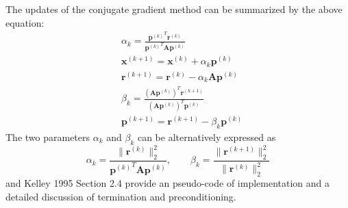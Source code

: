 \documentclass{article}
\begin{document}
The updates of the conjugate gradient method can be summarized by the above equation:
\begin{align*}
    & \alpha_k = 
    \frac{\left.\mathbf{p}^{(k)}\right.^T \mathbf{r}^{(k)}}
    {\left.\mathbf{p}^{(k)}\right.^T \mathbf{A} \mathbf{p}^{(k)}} \\
    & \mathbf{x}^{(k+1)} = \mathbf{x}^{(k)} + \alpha_k \mathbf{p}^{(k)} \\
    & \mathbf{r}^{(k+1)} = \mathbf{r}^{(k)} - \alpha_k \mathbf{A}\mathbf{p}^{(k)} \\
    & \beta_k = \frac{\left(\mathbf{A} \mathbf{p}^{(k)} \right)^T \mathbf{r}^{(k+1)}}{\left(\mathbf{A} \mathbf{p}^{(k)} \right)^T \mathbf{p}^{(k)}} \\
    & \mathbf{p}^{(k+1)} = \mathbf{r}^{(k+1)} - \beta_k \mathbf{p}^{(k)}
\end{align*}
The two parameters $\alpha_k$ and $\beta_k$ can be alternatively expressed as
\begin{equation*}
    \alpha_k = 
    \frac{\|\mathbf{r}^{(k)}\|_2^2}
    {\left.\mathbf{p}^{(k)}\right.^T \mathbf{A} \mathbf{p}^{(k)}}, \qquad 
    \beta_k = \frac{ \|\mathbf{r}^{(k+1)}\|_2^2 }{ \|\mathbf{r}^{(k)}\|_2^2} 
\end{equation*}
and Kelley 1995 Section 2.4 provide an pseudo-code of implementation and a detailed discussion 
of termination and preconditioning.
\end{document}
